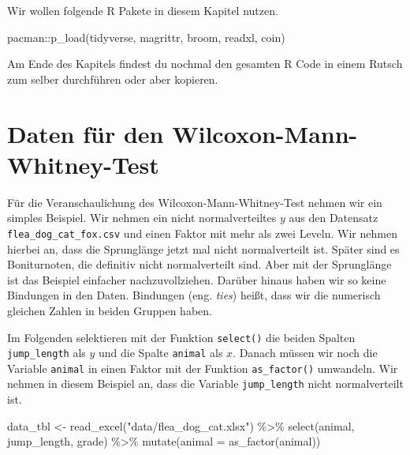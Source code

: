 \documentclass[
  letterpaper,
  DIV=11,
  oneside]{scrreport}
\newenvironment{Shaded}{\begin{snugshade}}{\end{snugshade}}
\newcommand{\AttributeTok}[1]{\textcolor[rgb]{0.40,0.45,0.13}{#1}}
\newcommand{\FunctionTok}[1]{\textcolor[rgb]{0.28,0.35,0.67}{#1}}
\newcommand{\NormalTok}[1]{\textcolor[rgb]{0.00,0.23,0.31}{#1}}
\newcommand{\OtherTok}[1]{\textcolor[rgb]{0.00,0.23,0.31}{#1}}
\newcommand{\SpecialCharTok}[1]{\textcolor[rgb]{0.37,0.37,0.37}{#1}}
\newcommand{\StringTok}[1]{\textcolor[rgb]{0.13,0.47,0.30}{#1}}
\begin{document}
Wir wollen folgende R Pakete in diesem Kapitel nutzen.

\begin{Shaded}
\begin{Highlighting}[]
\NormalTok{pacman}\SpecialCharTok{::}\FunctionTok{p\_load}\NormalTok{(tidyverse, magrittr, broom, }
\NormalTok{               readxl, coin)}
\end{Highlighting}
\end{Shaded}

Am Ende des Kapitels findest du nochmal den gesamten R Code in einem
Rutsch zum selber durchführen oder aber kopieren.

\hypertarget{daten-fuxfcr-den-wilcoxon-mann-whitney-test}{%
\section{Daten für den
Wilcoxon-Mann-Whitney-Test}\label{daten-fuxfcr-den-wilcoxon-mann-whitney-test}}

{}

Für die Veranschaulichung des Wilcoxon-Mann-Whitney-Test nehmen wir ein
simples Beispiel. Wir nehmen ein nicht normalverteiltes \(y\) aus den
Datensatz \texttt{flea\_dog\_cat\_fox.csv} und einen Faktor mit mehr als
zwei Leveln. Wir nehmen hierbei an, dass die Sprunglänge jetzt mal nicht
normalverteilt ist. Später sind es Boniturnoten, die definitiv nicht
normalverteilt sind. Aber mit der Sprunglänge ist das Beispiel einfacher
nachzuvollziehen. Darüber hinaus haben wir so keine Bindungen in den
Daten. Bindungen (eng. \emph{ties}) heißt, dass wir die numerisch
gleichen Zahlen in beiden Gruppen haben.

Im Folgenden selektieren mit der Funktion \texttt{select()} die beiden
Spalten \texttt{jump\_length} als \(y\) und die Spalte \texttt{animal}
als \(x\). Danach müssen wir noch die Variable \texttt{animal} in einen
Faktor mit der Funktion \texttt{as\_factor()} umwandeln. Wir nehmen in
diesem Beispiel an, dass die Variable \texttt{jump\_length} nicht
normalverteilt ist.

\begin{Shaded}
\begin{Highlighting}[]
\NormalTok{data\_tbl }\OtherTok{\textless{}{-}} \FunctionTok{read\_excel}\NormalTok{(}\StringTok{"data/flea\_dog\_cat.xlsx"}\NormalTok{) }\SpecialCharTok{\%\textgreater{}\%} 
  \FunctionTok{select}\NormalTok{(animal, jump\_length, grade) }\SpecialCharTok{\%\textgreater{}\%} 
  \FunctionTok{mutate}\NormalTok{(}\AttributeTok{animal =} \FunctionTok{as\_factor}\NormalTok{(animal))}
\end{Highlighting}
\end{Shaded}
\end{document}

